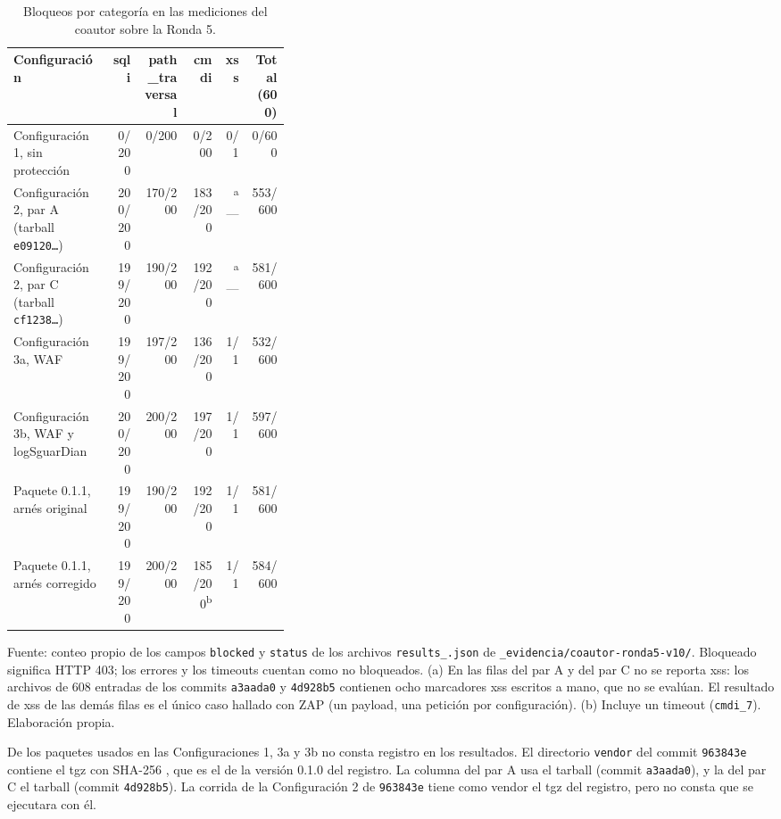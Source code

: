 \begin{table}[htbp]
\centering
\footnotesize
\setlength{\tabcolsep}{3pt}
\begin{tabular}{|p{0.36\linewidth}|r|r|r|r|r|}
\hline
\textbf{Configuración} & \textbf{sqli} & \textbf{path\_traversal} & \textbf{cmdi} & \textbf{xss} & \textbf{Total (600)} \\ \hline
Configuración 1, sin protección & 0/200 & 0/200 & 0/200 & 0/1 & 0/600 \\ \hline
Configuración 2, par A (tarball \texttt{e09120\ldots}) & 200/200 & 170/200 & 183/200 & \textsuperscript{a}— & 553/600 \\ \hline
Configuración 2, par C (tarball \texttt{cf1238\ldots}) & 199/200 & 190/200 & 192/200 & \textsuperscript{a}— & 581/600 \\ \hline
Configuración 3a, WAF & 199/200 & 197/200 & 136/200 & 1/1 & 532/600 \\ \hline
Configuración 3b, WAF y logSguarDian & 200/200 & 200/200 & 197/200 & 1/1 & 597/600 \\ \hline
Paquete 0.1.1, arnés original & 199/200 & 190/200 & 192/200 & 1/1 & 581/600 \\ \hline
Paquete 0.1.1, arnés corregido & 199/200 & 200/200 & 185/200\textsuperscript{b} & 1/1 & 584/600 \\ \hline
\end{tabular}
\caption{Bloqueos por categoría en las mediciones del coautor sobre la Ronda 5.}
\label{tabla:anexo-coautor-resultados}
\par\smallskip\footnotesize Fuente: conteo propio de los campos \texttt{blocked} y \texttt{status} de los archivos \texttt{results\_\allowbreak *.\allowbreak json} de \texttt{\_evidencia/coautor-ronda5-v10/}. Bloqueado significa HTTP 403; los errores y los timeouts cuentan como no bloqueados. (a) En las filas del par A y del par C no se reporta xss: los archivos de 608 entradas de los commits \texttt{a3aada0} y \texttt{4d928b5} contienen ocho marcadores xss escritos a mano, que no se evalúan. El resultado de xss de las demás filas es el único caso hallado con ZAP (un payload, una petición por configuración). (b) Incluye un timeout (\texttt{cmdi\_7}). Elaboración propia.
\end{table}

De los paquetes usados en las Configuraciones 1, 3a y 3b no consta registro en los resultados. El directorio \texttt{vendor} del commit \texttt{963843e} contiene el tgz con SHA-256 , que es el de la versión 0.1.0 del registro. La columna del par A usa el tarball  (commit \texttt{a3aada0}), y la del par C el tarball  (commit \texttt{4d928b5}). La corrida de la Configuración 2 de \texttt{963843e} tiene como vendor el tgz del registro, pero no consta que se ejecutara con él.

